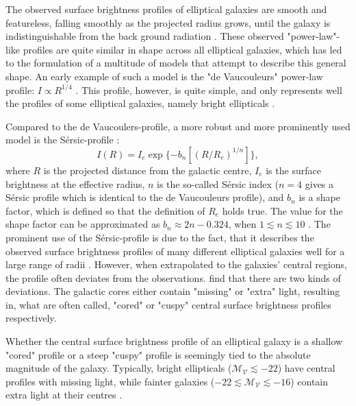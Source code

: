 \documentclass[english, oneside]{HYgradu}
\begin{document}
The observed surface brightness profiles of elliptical galaxies are smooth and featureless, falling smoothly as the projected radius grows, until the galaxy is indistinguishable from the back ground radiation \citep{BinneyTremaine}. These observed "power-law"-like profiles are quite similar in shape across all elliptical galaxies, which has led to the formulation of a multitude of models that attempt to describe this general shape. An early example of such a model is the "de Vaucouleurs" power-law profile: $I \propto R^{1/4}$ \citep{deVaucouleurs1948}. This profile, however, is quite simple, and only represents well the profiles of some elliptical galaxies, namely bright ellipticals \citep{MerrittBook}. 

Compared to the de Vaucoulers-profile, a more robust and more prominently used model is the Sérsic-profile \citep{Sersic1968}:
\begin{equation}
I (R) = I_e \exp \{ -b_n \left[ (R / R_e)^{1/n} \right] \},
\end{equation}
where $R$ is the projected distance from the galactic centre, $I_e$ is the surface brightness at the effective radius, $n$ is the so-called Sérsic index ($n=4$ gives a Sérsic profile which is identical to the de Vaucouleurs profile), and $b_n$ is a shape factor, which is defined so that the definition of $R_e$ holds true. The value for the shape factor can be approximated as $b_n \approx 2n - 0.324$, when $1 \lesssim n \lesssim 10$ \citep{BinneyTremaine}. The prominent use of the Sérsic-profile is due to the fact, that it describes the observed surface brightness profiles of many different elliptical galaxies well for a large range of radii \citep{MerrittBook}. However, when extrapolated to the galaxies' central regions, the profile often deviates from the observations. \cite{Kormendy2009} find that there are two kinds of deviations. The galactic cores either contain "missing" or "extra" light, resulting in, what are often called, "cored" or "cuspy" central surface brightness profiles respectively.

Whether the central surface brightness profile of an elliptical galaxy is a shallow "cored" profile or a steep "cuspy" profile is seemingly tied to the absolute magnitude of the galaxy. Typically, bright ellipticals ($\mathcal{M_V} \lesssim -22$) have central profiles with missing light, while fainter galaxies ($-22 \lesssim \mathcal{M_V} \lesssim -16$) contain extra light at their centres \citep{Kormendy2009}. 
\end{document}
